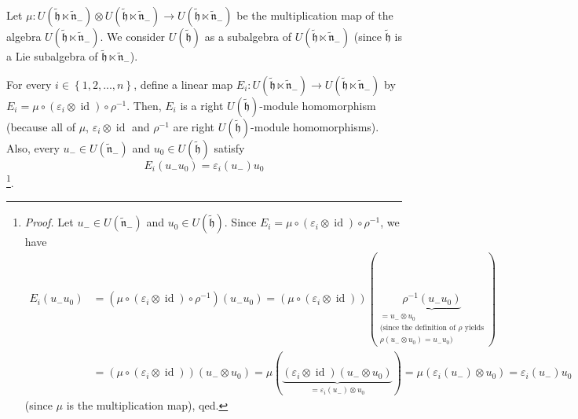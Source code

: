 \documentclass[etingof-lie.tex]{subfiles}
\begin{document}
\begin{verlong}
Let $\mu:U\left(  \widetilde{\mathfrak{h}}\ltimes\widetilde{\mathfrak{n}}%
_{-}\right)  \otimes U\left(  \widetilde{\mathfrak{h}}\ltimes
\widetilde{\mathfrak{n}}_{-}\right)  \rightarrow U\left(
\widetilde{\mathfrak{h}}\ltimes\widetilde{\mathfrak{n}}_{-}\right)  $ be the
multiplication map of the algebra $U\left(  \widetilde{\mathfrak{h}}%
\ltimes\widetilde{\mathfrak{n}}_{-}\right)  $. We consider $U\left(
\widetilde{\mathfrak{h}}\right)  $ as a subalgebra of $U\left(
\widetilde{\mathfrak{h}}\ltimes\widetilde{\mathfrak{n}}_{-}\right)  $ (since
$\widetilde{\mathfrak{h}}$ is a Lie subalgebra of $\widetilde{\mathfrak{h}%
}\ltimes\widetilde{\mathfrak{n}}_{-}$).

For every $i\in\left\{  1,2,...,n\right\}  $, define a linear map
$E_{i}:U\left(  \widetilde{\mathfrak{h}}\ltimes\widetilde{\mathfrak{n}}%
_{-}\right)  \rightarrow U\left(  \widetilde{\mathfrak{h}}\ltimes
\widetilde{\mathfrak{n}}_{-}\right)  $ by $E_{i}=\mu\circ\left(
\varepsilon_{i}\otimes\operatorname*{id}\right)  \circ\rho^{-1}$. Then,
$E_{i}$ is a right $U\left(  \widetilde{\mathfrak{h}}\right)  $-module
homomorphism (because all of $\mu$, $\varepsilon_{i}\otimes\operatorname*{id}$
and $\rho^{-1}$ are right $U\left(  \widetilde{\mathfrak{h}}\right)  $-module
homomorphisms). Also, every $u_{-}\in U\left(  \widetilde{\mathfrak{n}}%
_{-}\right)  $ and $u_{0}\in U\left(  \widetilde{\mathfrak{h}}\right)  $
satisfy%
\begin{equation}
E_{i}\left(  u_{-}u_{0}\right)  =\varepsilon_{i}\left(  u_{-}\right)  u_{0}
\label{pf.gtilde.b.Ei}%
\end{equation}
\footnote{\textit{Proof.} Let $u_{-}\in U\left(  \widetilde{\mathfrak{n}}%
_{-}\right)  $ and $u_{0}\in U\left(  \widetilde{\mathfrak{h}}\right)  $.
Since $E_{i}=\mu\circ\left(  \varepsilon_{i}\otimes\operatorname*{id}\right)
\circ\rho^{-1}$, we have
\begin{align*}
E_{i}\left(  u_{-}u_{0}\right)   &  =\left(  \mu\circ\left(  \varepsilon
_{i}\otimes\operatorname*{id}\right)  \circ\rho^{-1}\right)  \left(
u_{-}u_{0}\right)  =\left(  \mu\circ\left(  \varepsilon_{i}\otimes
\operatorname*{id}\right)  \right)  \left(  \underbrace{\rho^{-1}\left(
u_{-}u_{0}\right)  }_{\substack{=u_{-}\otimes u_{0}\\\text{(since the
definition of }\rho\text{ yields}\\\rho\left(  u_{-}\otimes u_{0}\right)
=u_{-}u_{0}\text{)}}}\right) \\
&  =\left(  \mu\circ\left(  \varepsilon_{i}\otimes\operatorname*{id}\right)
\right)  \left(  u_{-}\otimes u_{0}\right)  =\mu\left(  \underbrace{\left(
\varepsilon_{i}\otimes\operatorname*{id}\right)  \left(  u_{-}\otimes
u_{0}\right)  }_{=\varepsilon_{i}\left(  u_{-}\right)  \otimes u_{0}}\right)
=\mu\left(  \varepsilon_{i}\left(  u_{-}\right)  \otimes u_{0}\right)
=\varepsilon_{i}\left(  u_{-}\right)  u_{0}%
\end{align*}
(since $\mu$ is the multiplication map), qed.}.
\end{verlong}
\end{document}
